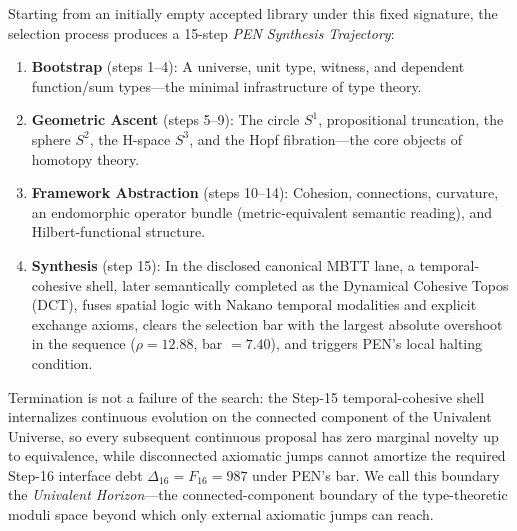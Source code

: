 \documentclass[11pt,a4paper]{article}
\theoremstyle{plain}
\theoremstyle{definition}
\theoremstyle{remark}
\begin{document}
Starting from an initially empty accepted library under this fixed signature, the selection process produces a 15-step \emph{PEN Synthesis Trajectory}:
\begin{enumerate}[nosep]
    \item \textbf{Bootstrap} (steps 1--4): A universe, unit type, witness, and dependent function/sum types---the minimal infrastructure of type theory.
    \item \textbf{Geometric Ascent} (steps 5--9): The circle $S^1$, propositional truncation, the sphere $S^2$, the H-space $S^3$, and the Hopf fibration---the core objects of homotopy theory.
    \item \textbf{Framework Abstraction} (steps 10--14): Cohesion, connections, curvature, an endomorphic operator bundle (metric-equivalent semantic reading), and Hilbert-functional structure.
    \item \textbf{Synthesis} (step 15): In the disclosed canonical MBTT lane, a temporal-cohesive shell, later semantically completed as the Dynamical Cohesive Topos (DCT), fuses spatial logic with Nakano temporal modalities and explicit exchange axioms, clears the selection bar with the largest absolute overshoot in the sequence ($\rho = 12.88$, bar $= 7.40$), and triggers PEN's local halting condition.
\end{enumerate}
Termination is not a failure of the search: the Step-15 temporal-cohesive shell internalizes continuous evolution on the connected component of the Univalent Universe, so every subsequent continuous proposal has zero marginal novelty up to equivalence, while disconnected axiomatic jumps cannot amortize the required Step-16 interface debt $\Delta_{16}=F_{16}=987$ under PEN's bar.
We call this boundary the \emph{Univalent Horizon}---the connected-component boundary of the type-theoretic moduli space beyond which only external axiomatic jumps can reach.
\end{document}
